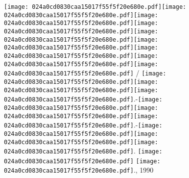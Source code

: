 \documentclass{article}
\newcommand{\origpg}[2]{\texttt{[image: 024a0cd0830caa15017f55f5f20e680e.pdf]}}
\begin{document}
{\vspace{0.385pt}\origpg{15}{85.303pt 491.09pt 92.469pt 507.24pt}\origpg{15}{92.517pt 491.09pt 101.15pt 507.24pt}\origpg{15}{101.15pt 491.09pt 108.32pt 507.24pt}\origpg{15}{108.4pt 491.09pt 115.45pt 507.24pt}\origpg{15}{115.39pt 491.09pt 122.55pt 507.24pt}\hspace{-0.178pt}\origpg{15}{122.38pt 491.09pt 132.59pt 507.24pt}\origpg{15}{132.5pt 491.09pt 139.66pt 507.24pt}\origpg{15}{139.71pt 491.09pt 149.93pt 507.24pt}\origpg{15}{149.83pt 491.09pt 158.47pt 507.24pt} / \origpg{15}{170.87pt 491.09pt 183.62pt 507.24pt}\origpg{15}{183.62pt 491.09pt 192.25pt 507.24pt}\origpg{15}{192.29pt 491.09pt 198.66pt 507.24pt}.-\origpg{15}{207.97pt 491.09pt 218.18pt 507.24pt}\origpg{15}{218.09pt 491.09pt 225.25pt 507.24pt}\hspace{-0.42pt}\origpg{15}{224.83pt 491.09pt 231.89pt 507.24pt}\hspace{-1.486pt}.-\origpg{15}{239.8pt 491.09pt 247.85pt 507.24pt}\origpg{15}{247.75pt 491.09pt 256.39pt 507.24pt}\origpg{15}{256.39pt 491.09pt 263.44pt 507.24pt}\hspace{-1.242pt}. \origpg{15}{270.15pt 491.09pt 278.22pt 507.24pt} \origpg{15}{282.19pt 491.09pt 296.54pt 507.24pt}\hspace{0.105pt}., 1990 

}
\end{document}
